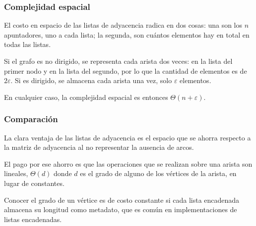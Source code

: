 \begin{center}
  \label{fig:lista_de_adyacencia}
\end{center}

\subsubsection{Complejidad espacial}

El costo en espacio de las listas de adyacencia radica en dos cosas: una son los \(n\) apuntadores, uno a cada lista; la segunda, son cuántos elementos hay en total en todas las listas.

Si el grafo es no dirigido, se representa cada arista dos veces: en la lista del primer nodo y en la lista del segundo, por lo que la cantidad de elementos es de \(2\varepsilon\). Si es dirigido, se almacena cada arista una vez, solo \(\varepsilon\) elementos.

En cualquier caso, la complejidad espacial es entonces \(\Theta(n+\varepsilon)\).

\subsubsection{Comparación}
\label{sec:comparacion}

La clara ventaja de las listas de adyacencia es el espacio que se ahorra respecto a la matriz de adyacencia al no representar la ausencia de arcos.

El pago por ese ahorro es que las operaciones que se realizan sobre una arista son lineales, \(\Theta(d)\) donde \(d\) es el grado de alguno de los vértices de la arista, en lugar de constantes.

Conocer el grado de un vértice es de costo constante si cada lista encadenada almacena su longitud como metadato, que es común en implementaciones de listas encadenadas.